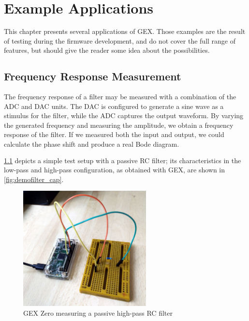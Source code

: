 \chapter{Example Applications}

This chapter presents several applications of GEX. Those examples are the result of testing during the firmware development, and do not cover the full range of features, but should give the reader some idea about the possibilities.

\section{Frequency Response Measurement}

The frequency response of a filter may be measured with a combination of the ADC and DAC units. The DAC is configured to generate a sine wave as a stimulus for the filter, while the ADC captures the output waveform. By varying the generated frequency and measuring the amplitude, we obtain a frequency response of the filter. If we measured both the input and output, we could calculate the phase shift and produce a real Bode diagram.

\cref{fig:demofilter} depicts a simple test setup with a passive RC filter; its characteristics in the low-pass and high-pass configuration, as obtained with GEX, are shown in \cref{fig:demofilter_cap}.

\begin{figure}[h]
	\centering
	\includegraphics[width=0.6\textwidth]{img/demofilter.jpg}
	\caption{GEX Zero measuring a passive high-pass RC filter}
	\label{fig:demofilter}
\end{figure}

